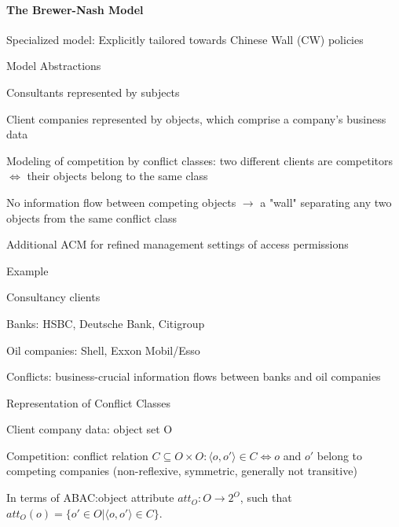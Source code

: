 \documentclass[a4paper]{article}
\begin{document}
\begin{multicols}{3}
    \paragraph{The Brewer-Nash Model}
    Specialized model: Explicitly tailored towards Chinese Wall (CW) policies

    Model Abstractions
    \begin{itemize*}
        \item Consultants represented by subjects
        \item Client companies represented by objects, which comprise a company’s business data
        \item Modeling of competition by conflict classes: two different clients are competitors $\Leftrightarrow$ their objects belong to the same class
        \item No information flow between competing objects $\rightarrow$ a "wall" separating any two objects from the same conflict class
        \item Additional ACM for refined management settings of access permissions
    \end{itemize*}

    Example
    \begin{itemize*}
        \item Consultancy clients
              \begin{itemize*}
                  \item Banks: HSBC, Deutsche Bank, Citigroup
                  \item Oil companies: Shell, Exxon Mobil/Esso
              \end{itemize*}
        \item Conflicts: business-crucial information flows between banks and oil companies
    \end{itemize*}

    Representation of Conflict Classes
    \begin{itemize*}
        \item Client company data: object set O
        \item Competition: conflict relation $C\subseteq O\times O:⟨o,o'⟩\in C\Leftrightarrow o$ and $o'$ belong to competing companies (non-reflexive, symmetric, generally not transitive)
        \item In terms of ABAC:object attribute $att_O:O\rightarrow 2^O$, such that $att_O(o)=\{o'\in O|⟨o,o'⟩\in C\}$.
    \end{itemize*}


\end{multicols}
\end{document}
